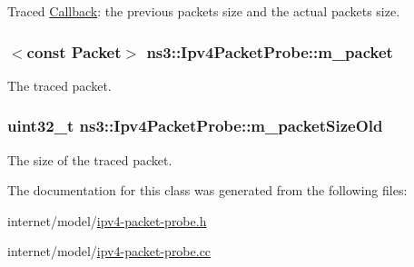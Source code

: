Traced \hyperlink{classns3_1_1Callback}{Callback}\+: the previous packet\textquotesingle{}s size and the actual packet\textquotesingle{}s size. 

\subsubsection[{\texorpdfstring{m\+\_\+packet}{m_packet}}]{$<$const {\bf Packet}$>$ ns3\+::\+Ipv4\+Packet\+Probe\+::m\+\_\+packet\hspace{0.3cm}{\ttfamily [private]}}\hypertarget{classns3_1_1Ipv4PacketProbe_afd7bd4c27110432ba13e62c4c1f6d71b}{}\label{classns3_1_1Ipv4PacketProbe_afd7bd4c27110432ba13e62c4c1f6d71b}


The traced packet. 

\subsubsection[{\texorpdfstring{m\+\_\+packet\+Size\+Old}{m_packetSizeOld}}]{\setlength{\rightskip}{0pt plus 5cm}uint32\+\_\+t ns3\+::\+Ipv4\+Packet\+Probe\+::m\+\_\+packet\+Size\+Old\hspace{0.3cm}{\ttfamily [private]}}\hypertarget{classns3_1_1Ipv4PacketProbe_a1ece8c9dd8ac358c5e45eb80beecce40}{}\label{classns3_1_1Ipv4PacketProbe_a1ece8c9dd8ac358c5e45eb80beecce40}


The size of the traced packet. 



The documentation for this class was generated from the following files\+:\begin{DoxyCompactItemize}
\item 
internet/model/\hyperlink{ipv4-packet-probe_8h}{ipv4-\/packet-\/probe.\+h}\item 
internet/model/\hyperlink{ipv4-packet-probe_8cc}{ipv4-\/packet-\/probe.\+cc}\end{DoxyCompactItemize}
